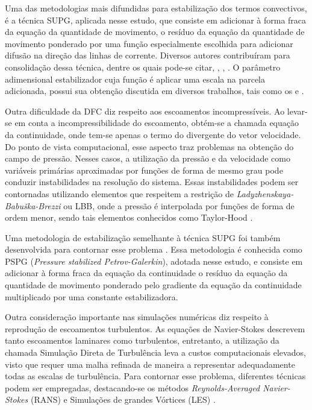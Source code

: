 \documentclass[tese_patricia.tex]{subfiles}
\begin{document}
Uma das metodologias mais difundidas para estabilização dos termos convectivos, é a técnica SUPG, aplicada nesse estudo, que consiste em adicionar à forma fraca da equação da quantidade de movimento, o resíduo da equação da quantidade de movimento ponderado por uma função especialmente escolhida para adicionar difusão na direção das linhas de corrente. Diversos autores contribuíram para consolidação dessa técnica, dentre os quais pode-se citar, , , . O parâmetro adimensional estabilizador cuja função é aplicar uma escala na parcela adicionada, possui sua obtenção discutida em diversos trabalhos, tais como os  e .

Outra dificuldade da DFC diz respeito aos escoamentos incompressíveis. Ao levar-se em conta a incompressibilidade do escoamento, obtém-se a chamada equação da continuidade, onde tem-se apenas o termo do divergente do vetor velocidade. Do ponto de vista computacional, esse aspecto traz problemas na obtenção do campo de pressão. Nesses casos, a utilização da pressão e da velocidade como variáveis primárias aproximadas por funções de forma de mesmo grau pode conduzir instabilidades na resolução do sistema. Essas instabilidades podem ser contornadas utilizando elementos que respeitem a restrição de \textit{Ladyzhenskaya-Babuška-Brezzi} ou LBB, onde a pressão é interpolada por funções de forma de ordem menor, sendo tais elementos conhecidos como Taylor-Hood \cite{BrezziF:1991,ZienkiewiczTN:2005,StrangF:2008}.

Uma metodologia de estabilização semelhante à técnica SUPG foi também desenvolvida para contornar esse problema \cite{HughesFB:1986,TezduyarMRS:1992a}. Essa metodologia é conhecida como PSPG (\textit{Pressure stabilized Petrov-Galerkin}), adotada nesse estudo, e consiste em adicionar à forma fraca da equação da continuidade o resíduo da equação da quantidade de movimento ponderado pelo gradiente da equação da continuidade multiplicado por uma constante estabilizadora. 

Outra consideração importante nas simulações numéricas diz respeito à reprodução de escoamentos turbulentos. As equações de Navier-Stokes descrevem tanto escoamentos laminares como turbulentos, entretanto, a utilização da chamada Simulação Direta de Turbulência leva a custos computacionais elevados, visto que requer uma malha refinada de maneira a representar adequadamente todas as escalas de turbulência. Para contornar esse problema, diferentes técnicas podem ser empregadas, destacando-se os métodos \textit{Reynolds-Averaged Navier-Stokes} (RANS) \cite{Speziale1991,Alfonsi2009} e Simulações de grandes Vórtices (LES) \cite{LaunderS:1972,Germano1991,Wilcox:1993,PIOMELLI1999}.
\end{document}
